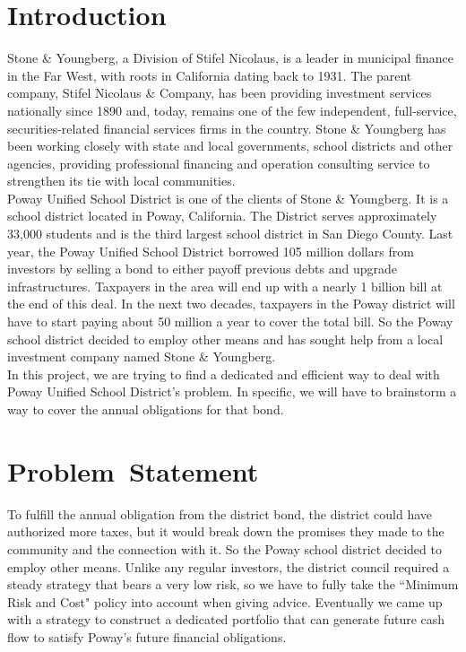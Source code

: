 \documentclass[oneside,12pt]{report}
\begin{document}
{
\chapter{Introduction}\label{}

Stone \& Youngberg, a Division of Stifel Nicolaus, is a leader in municipal finance in the Far West, with roots in California dating back to 1931. The parent company, Stifel Nicolaus \& Company, has been providing investment services nationally since 1890 and, today, remains one of the few independent, full-service, securities-related financial services firms in the country. Stone \& Youngberg has been working closely with state and local governments, school districts and other agencies, providing professional financing and operation consulting service to strengthen its tie with local communities.\\

\noindent Poway Unified School District is one of the clients of Stone \& Youngberg. It is a school district located in Poway, California. The District serves approximately 33,000 students and is the third largest school district in San Diego County. Last year, the Poway Unified School District borrowed 105 million dollars from investors by selling a bond to either payoff previous debts and upgrade infrastructures. Taxpayers in the area will end up with a nearly 1 billion bill at the end of this deal. In the next two decades, taxpayers in the Poway district will have to start paying about 50 million a year to cover the total bill. So the Poway school district decided to employ other means and has sought help from a local investment company named Stone \& Youngberg.\\

\noindent In this project, we are trying to find a dedicated and efficient way to deal with Poway Unified School District's problem. In specific, we will have to brainstorm a way to cover the annual obligations for that bond.



\chapter{Problem~Statement}\label{}
%
To fulfill the annual obligation from the district bond, the district could have authorized more taxes, but it would break down the promises they made to the community and the connection with it. So the Poway school district decided to employ other means. Unlike any regular investors, the district council required a steady strategy that bears a very low risk, so we have to fully take the ``Minimum Risk and Cost" policy into account when giving advice. Eventually we came up with a strategy to construct a dedicated portfolio that can generate future cash flow to satisfy Poway's future financial obligations. \\

}
\end{document}
